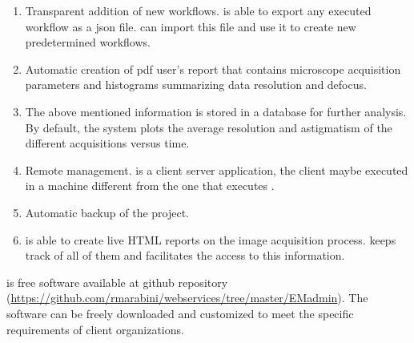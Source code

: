 \begin{enumerate}
 \item Transparent addition of new workflows. \scipion is able to export any executed workflow as a json file. \emadmin can import this file and use it to create new predetermined workflows.
 \item  Automatic creation of pdf user's report that contains microscope acquisition parameters and histograms summarizing data resolution and defocus. 
 \item The above mentioned information is stored in a database for further analysis. By default, the system plots the  average resolution and astigmatism of the different acquisitions versus time.
 \item Remote management. \emadmin is a client server application, the client maybe executed in a machine different from the one that executes \scipion.
 \item Automatic backup of the \scipion project.
 \item \scipion is able to create live HTML reports on the image acquisition process. \emadmin keeps track of all of them and facilitates the access to this information.
\end{enumerate}

\emadmin is free software available at github repository (\url{https://github.com/rmarabini/webservices/tree/master/EMadmin}). The software can be freely downloaded and customized to meet the specific requirements of client organizations.

